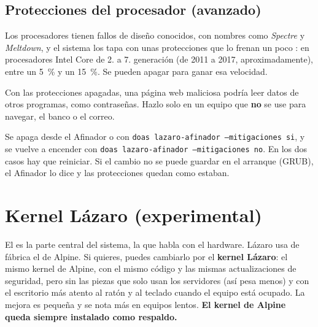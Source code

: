 \subsection{Protecciones del procesador (avanzado)}
Los procesadores tienen fallos de diseño conocidos, con nombres como
\emph{Spectre} y \emph{Meltdown}, y el sistema los tapa con unas
protecciones que lo frenan un poco \cite{spectre-meltdown,kernel-mitigations}:
en procesadores Intel Core de 2.\textordfeminine{} a 7.\textordfeminine{}
generación (de 2011 a 2017, aproximadamente), entre un 5~\% y un 15~\%. Se
pueden apagar para ganar esa velocidad.

\begin{cuidado}
Con las protecciones apagadas, una página web maliciosa podría leer datos
de otros programas, como contraseñas. Hazlo solo en un equipo que
\textbf{no} se use para navegar, el banco o el correo.
\end{cuidado}

Se apaga desde el Afinador o con \texttt{doas lazaro-afinador
--mitigaciones si}, y se vuelve a encender con \texttt{doas
lazaro-afinador --mitigaciones no}. En los dos casos hay que reiniciar.
Si el cambio no se puede guardar en el arranque (GRUB), el Afinador lo
dice y las protecciones quedan como estaban.

\section{Kernel Lázaro (experimental)}\label{sec:kernel-lazaro}

El  es la parte central del sistema, la que habla con el
hardware. Lázaro usa de fábrica el de Alpine. Si quieres, puedes cambiarlo
por el \textbf{kernel Lázaro}: el mismo kernel de Alpine, con el mismo
código y las mismas actualizaciones de seguridad, pero sin las piezas que
solo usan los servidores (así pesa menos) y con el escritorio más atento al
ratón y al teclado cuando el equipo está ocupado. La mejora es pequeña y se
nota más en equipos lentos. \textbf{El kernel de Alpine queda siempre
instalado como respaldo.}

